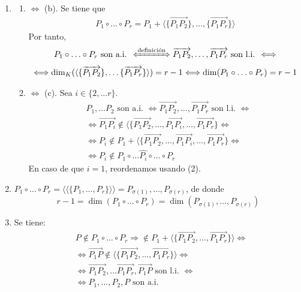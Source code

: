 \documentclass[12pt, a4paper, ones, notitlepage, openany,titlepage]{article}
\begin{document}
\begin{enumerate}[label=(\arabic*)]
	\item \begin{enumerate}[label=(\alph*)]
		\item $\Longleftrightarrow$ (b). Se tiene que
		\begin{gather*}
			P_1 \circ \ldots \circ P_r = P_1 + \langle \{\overrightarrow{P_1 P_2}\}, \ldots, \{\overrightarrow{P_1 P_r}\} \rangle
		\end{gather*}
		Por tanto,
		\begin{gather*}
			P_1 \circ \ldots \circ P_r \text{ son a.i. } \xLeftrightarrow{\text{definición}} \overrightarrow{P_1 P_2}, \ldots, \overrightarrow{P_1 P_r} \text{ son l.i. } \Longleftrightarrow \\ \Longleftrightarrow \dim_K (\langle \{\overrightarrow{P_1 P_2}\}, \ldots \{\overrightarrow{P_1 P_r}\}\rangle) = r - 1 \Longleftrightarrow \dim(P_1 \circ \ldots \circ P_r) = r - 1
		\end{gather*}
		\item $\Longleftrightarrow$ (c). Sea $i \in \{2, \ldots r\}$.
		$$
		\begin{aligned}
			& P_1, \ldots P_2 \text{ son a.i. } \Longleftrightarrow \overrightarrow{P_1 P_2}, \ldots, \overrightarrow{P_1 P_r} \text{ son l.i. } \Longleftrightarrow \\
			& \Longleftrightarrow \overrightarrow{P_1 P_i} \notin \langle \{\overrightarrow{P_1 P_2}, \ldots, \overrightarrow{P_1 P_i}, \ldots, \overrightarrow{P_1 P_r}\} \Longleftrightarrow \\
			& \Longleftrightarrow P_i \notin P_1 + \langle \{\overrightarrow{P_1 P_2}, \ldots, \overrightarrow{P_1 P_i}, \ldots, \overrightarrow{P_1 P_r}\} \Longleftrightarrow \\
			& \Longleftrightarrow P_i \notin P_1 \circ \ldots \widehat{P_i} \circ \ldots \circ P_r
		\end{aligned}
		$$
		En caso de que $i = 1$, reordenamos usando (2).
	\end{enumerate}

	\item $P_1 \circ \ldots \circ P_r = \langle\langle \{P_1, \ldots, P_r\} \rangle\rangle = P_{\sigma(1)}, \ldots, P_{\sigma(r)}$, de donde
	$$
	r - 1 = \dim(P_1 \circ \ldots \circ P_r) = \dim(P_{\sigma(1)}, \ldots, P_{\sigma(r)})
	$$
	
	\item Se tiene:
	$$
	\begin{aligned}
	& P \notin P_1 \circ \ldots \circ P_r \Longrightarrow \notin P_1 + \langle \{\overrightarrow{P_1 P_2}, \ldots, \overrightarrow{P_1 P_r}\} \rangle \Longleftrightarrow \\
	& \Longleftrightarrow \overrightarrow{P_1 P} \notin \langle \{\overrightarrow{P_1 P_2}, \ldots, \overrightarrow{P_1 P_r}\} \rangle \Longleftrightarrow \\
	& \Longleftrightarrow \overrightarrow{P_1 P_2}, \ldots \overrightarrow{P_1 P_r}, \overrightarrow{P_1 P} \text{ son l.i. } \Longleftrightarrow \\
	& \Longleftrightarrow P_1, \ldots, P_2, P \text{ son a.i. }
	\end{aligned}
	$$


\end{enumerate}
\end{document}

